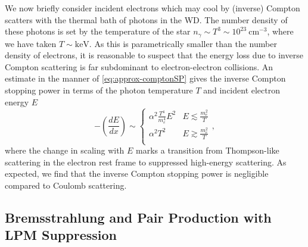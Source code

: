 \documentclass[twocolumn,showpacs,preprintnumbers,amsmath,amssymb,prd]{revtex4}
\newcommand{\cm}{\text{cm}}
\def\r{\right)}
\def\l{\left(}
\begin{document}
\begin{appendices}
We now briefly consider incident electrons which may cool by (inverse) Compton scatters with the thermal bath of photons in the WD.  
The number density of these photons is set by the temperature of the star $n_\gamma \sim T^3 \sim 10^{23} ~\cm^{-3}$, where we have taken $T \sim \text{keV}$. 
As this is parametrically smaller than the number density of electrons, it is reasonable to suspect that the energy loss due to inverse Compton scattering is far subdominant to electron-electron collisions.
An estimate in the manner of \eqref{eq:approx-comptonSP} gives the inverse Compton stopping power in terms of the photon temperature $T$ and incident electron energy $E$ 
\begin{equation}
\label{eq:invcomptonSP}
  -\l \frac{dE}{dx}\r \sim 
  \begin{cases}
    \alpha^2 \frac{T^4}{m_e^4} E^2 & E \lesssim \frac{m_e^2}{T} \\
    \alpha^2 T^2 & E \gtrsim \frac{m_e^2}{T} \\
  \end{cases},
\end{equation}
where the change in scaling with $E$ marks a transition from Thompson-like scattering in the electron rest frame to suppressed high-energy scattering.
As expected, we find that the inverse Compton stopping power is negligible compared to Coulomb scattering. 

\subsection{Bremsstrahlung and Pair Production with LPM Suppression}


\end{appendices}
\end{document}

